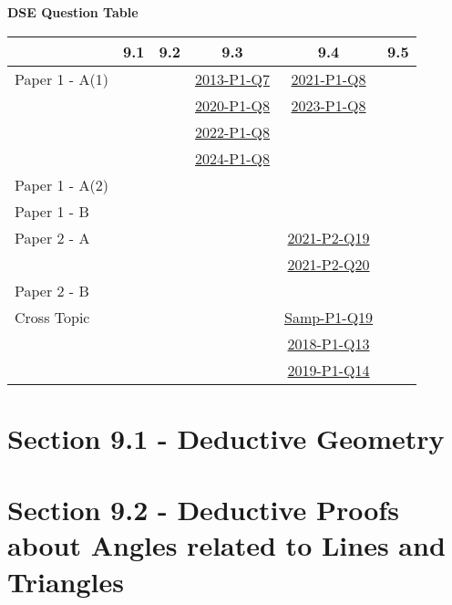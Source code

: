 \documentclass[12pt, a4paper]{article}
\begin{document}
\begin{absolutelynopagebreak}
\begin{center}
\textbf{DSE Question Table}
\end{center}
\begin{center}
\begin{tabular}{|l|c|c|c|c|c|}
\hline
        & 9.1 & 9.2 & 9.3 & 9.4 & 9.5 \\\hline
\hline
Paper 1 - A(1)&  &  & \hyperref[DSE2013-CoreP1-Q07]{2013-P1-Q7} & \hyperref[DSE2021-CoreP1-Q08]{2021-P1-Q8} &  \\
&  &  & \hyperref[DSE2020-CoreP1-Q08]{2020-P1-Q8} & \hyperref[DSE2023-CoreP1-Q08]{2023-P1-Q8} &  \\
&  &  & \hyperref[DSE2022-CoreP1-Q08]{2022-P1-Q8} &  &  \\
&  &  & \hyperref[DSE2024-CoreP1-Q08]{2024-P1-Q8} &  &  \\
\hline
Paper 1 - A(2)&  &  &  &  &  \\
\hline
Paper 1 - B&  &  &  &  &  \\
\hline
\hline
Paper 2 - A&  &  &  & \hyperref[DSE2021-CoreP2-Q19]{2021-P2-Q19} &  \\
&  &  &  & \hyperref[DSE2021-CoreP2-Q20]{2021-P2-Q20} &  \\
\hline
Paper 2 - B&  &  &  &  &  \\
\hline
\hline
Cross Topic&  &  &  & \hyperref[DSE2012S-CoreP1-Q19]{Samp-P1-Q19} &  \\
&  &  &  & \hyperref[DSE2018-CoreP1-Q13]{2018-P1-Q13} &  \\
&  &  &  & \hyperref[DSE2019-CoreP1-Q14]{2019-P1-Q14} &  \\
\hline
\end{tabular}
\end{center}
\end{absolutelynopagebreak}




\section*{Section 9.1 - Deductive Geometry}\label{section:2-9-1}





\section*{Section 9.2 - Deductive Proofs about Angles related to Lines and Triangles}\label{section:2-9-2}
\end{document}
